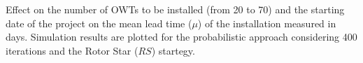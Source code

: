 \label{fig:effectnumber}
Effect on the number of OWTs to be installed (from 20 to 70) and the starting date of the project on the mean lead time ($\mu$) of the installation measured in days. Simulation results are plotted for the probabilistic approach considering 400 iterations and the Rotor Star ($RS$) startegy.